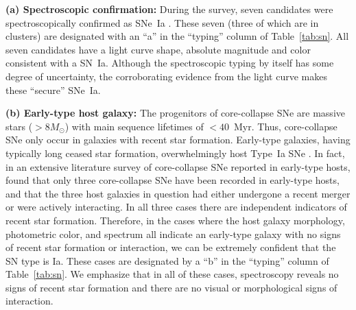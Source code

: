 
{\bf (a) Spectroscopic confirmation:} During the survey, seven
candidates were spectroscopically confirmed as
SNe~Ia \citep{dawson09a,morokuma10a}. These seven (three of which are in
clusters) are designated with an ``a'' in the ``typing'' column of
Table~\ref{tab:sn}. All seven candidates have a light curve shape,
absolute magnitude and color consistent with a SN~Ia. Although the
spectroscopic typing by itself has some degree of uncertainty, the
corroborating evidence from the light curve makes these ``secure''
SNe~Ia.

{\bf (b) Early-type host galaxy:} The progenitors of core-collapse SNe
are massive stars ($> 8 M_{\odot}$) with main sequence lifetimes of
$<40$~Myr. Thus, core-collapse SNe only occur in galaxies with recent
star formation. Early-type galaxies, having typically long ceased star
formation, overwhelmingly host Type~Ia
SNe \citep[e.g.,][]{cappellaro99a,hamuy00a}. In fact, in an extensive
literature survey of core-collapse SNe reported in early-type
hosts, \citet{hakobyan08a} found that only three core-collapse SNe
have been recorded in early-type hosts, and that the three host
galaxies in question had either undergone a recent merger or were
actively interacting. In all three cases there are independent
indicators of recent star formation. Therefore, in the cases where the
host galaxy morphology, photometric color, and spectrum all indicate
an early-type galaxy with no signs of recent star formation or
interaction, we can be extremely confident that the SN type is
Ia. These cases are designated by a ``b'' in the ``typing'' column of
Table~\ref{tab:sn}. We emphasize that in all of these cases,
spectroscopy reveals no signs of recent star formation and there are
no visual or morphological signs of interaction. \citep[See][for
detailed studies of these SN host galaxy properties.]{meyers11a}


